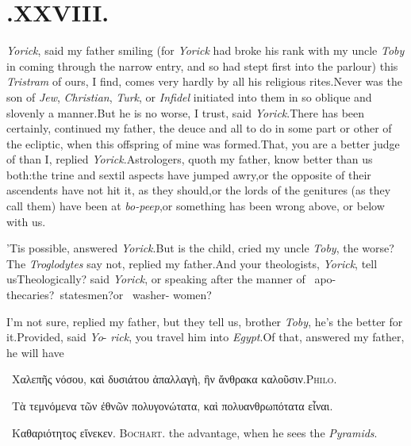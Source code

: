 \documentclass{article}
\begin{document}
\null{}\baselineskip\etp
\section{.\enspace  XXVIII.}

 \textit{Yorick}, said my father smiling (for
\textit{Yorick} had broke his rank with my uncle \textit{Toby} in coming
through the narrow entry, and so had stept first into the parlour)\tsk
this \textit{Tristram} of ours, I find, comes very hardly by all his
religious rites.\tsk Never was the son of \textit{Jew},
\textit{Christian}, \textit{Turk}, or \textit{Infidel} initiated into
them in so oblique and slovenly a manner.\tsk But he is no worse, I
trust, said \textit{Yorick}.\tsk There has been certainly, continued my
father, the deuce and all to do in some part or other of the ecliptic,
when this offspring of mine was formed.\break\tsk That, you are a better
judge of than I, replied \textit{Yorick}.\tsk Astrologers, quoth my
father, know better than us both:\tsk the trine and sextil aspects have
jumped awry,\tsk or the opposite of their ascendents have not hit it, as
they should,\tsk or the lords of the genitures (as they call them)
have been at \textit{bo-peep},\tsk or something has been wrong above, or
below with us.

’Tis possible, answered \textit{Yorick}.\tsk But is the child, cried my
uncle \textit{Toby}, the worse?\tsk The \textit{Troglodytes} say not, replied my
father.\tsk And your theologists, \textit{Yo\-rick}, tell us\tsk Theologically? said
\textit{Yorick},\break
\tsk or speaking after the manner of \fnast\ apo-\break
thecaries?\tsk \dagger\ statesmen?\tsk or \ddagger\ washer-\break
women?

\enlargethispage\baselineskip

\tsh  I’m not sure, replied my father,\break
\tsk but they tell us, brother \textit{Toby}, he’s\break
the better for it.\tsh Provided, said \textit{Yo}-\break
\textit{rick}, you travel him into \textit{Egypt}.\tsk Of\break
that, answered my father, he will have\break

\bgroup\footnotesize
\indent\fnast\ Χαλεπῆς νόσου, καὶ δυσιάτου ἀπαλλαγὴ, ἣν ἄνθρακα
καλοῦσιν.\hfill\textsc{Philo}.

\indent\dagger\ Τὰ τεμνόμενα τῶν ἐθνῶν πολυγονώτατα, καὶ πολυανθρωπότατα εἶναι.

\indent\ddagger\ Καθαριότητος εἵνεκεν. \hfill \textsc{Bochart}. 
\egroup
{}
\newpage\noindent
the advantage, when he sees the \textit{Pyramids}.\tsh
\end{document}
